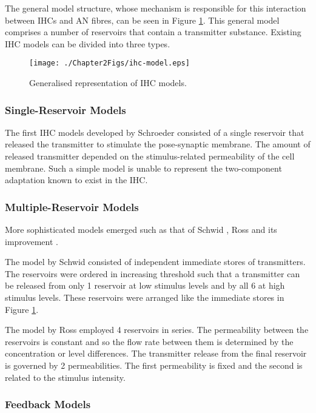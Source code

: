 \documentclass[11pt]{article}
\begin{document}
The general model structure, whose mechanism is responsible for this
interaction between IHCs and AN fibres, can be seen in
Figure \ref{fig:ihc-model}. This general model comprises a number of
reservoirs that contain a transmitter substance. Existing IHC models
can be divided into three types.

\begin{figure}[htb]
\centering
\texttt{[image: ./Chapter2Figs/ihc-model.eps]}
\caption{\label{fig:ihc-model}Generalised representation of IHC models.}
\end{figure}
\subsubsection{Single-Reservoir Models}
\label{sec-3-4-1}
\label{sec:ch2-signle-reservoir-models}

The first IHC models developed by Schroeder \cite{Schroeder1974}
consisted of a single reservoir that released the transmitter to stimulate
the pose-synaptic membrane. The amount of released transmitter
depended on the stimulus-related permeability of the cell membrane.
Such a simple model is unable to represent the two-component
adaptation known to exist in the IHC.
\subsubsection{Multiple-Reservoir Models}
\label{sec-3-4-2}
\label{sec:ch2-multiple-reservoir-models}

More sophisticated models emerged such as that of Schwid
\cite{Schwid1982}, Ross \cite{Ross1982} and its improvement
\cite{Ross1996}.

The model by Schwid \cite{Schwid1982} consisted of independent
immediate stores of transmitters. The reservoirs were ordered in
increasing threshold such that a transmitter can be released from only 1
reservoir at low stimulus levels and by all 6 at high stimulus levels.
These reservoirs were arranged like the immediate stores in Figure
\ref{fig:ihc-model}.

The model by Ross \cite{Ross1982} employed 4 reservoirs in series.
The permeability between the reservoirs is constant and so the flow rate
between them is determined by the concentration or level differences.
The transmitter release from the final reservoir is governed by 2
permeabilities. The first permeability is fixed and the second is
related to the stimulus intensity.
\subsubsection{Feedback Models}
\label{sec-3-4-3}
\label{sec:ch2-feedback-models}
\end{document}
